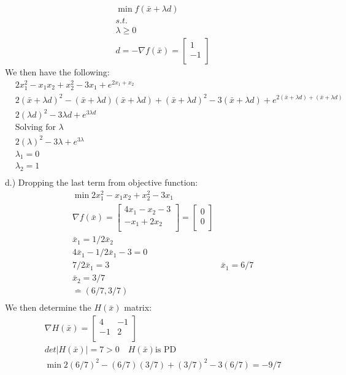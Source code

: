 \documentclass[12pt]{article}
\begin{document}
    \begin{align*}
        &\min f(\bar x + \lambda d)\\
        &s.t. \\
        &\lambda \geq 0\\
        &d = -\nabla f(\bar x) = 
        \begin{bmatrix}
            1\\
            -1\\
        \end{bmatrix}
    \end{align*}
We then have the following: 
    \begin{align*}
        &2x_1^2 -x_1x_2 + x_2^2 - 3x_1 + e^{2x_1 + x_2}\\
        &2(\bar x + \lambda d)^2 -(\bar x + \lambda d)(\bar x + \lambda d) + (\bar x + \lambda d)^2 - 3(\bar x + \lambda d)+ e^{2(\bar x + \lambda d) + (\bar x + \lambda d)}\\
        &2(\lambda d)^2 - 3\lambda  d + e^{3 \lambda d}\\
        &\text{Solving for } \lambda \\ 
        &2(\lambda)^2 - 3\lambda+ e^{3 \lambda}\\
        &\lambda_1 = 0\\
        &\lambda_2 = 1\\
    \end{align*}
d.) Dropping the last term from objective function:\\
    \begin{align*}
        &\min 2x_1^2 -x_1x_2 + x_2^2 - 3x_1\\
        &\nabla f(\bar x) = 
        \begin{bmatrix}
            4x_1 - x_2 -3\\
            -x_1 + 2x_2\\
        \end{bmatrix}
        = 
        \begin{bmatrix}
            0\\
            0\\
        \end{bmatrix}\\
        &\bar x_1 = 1/2 \bar x_2\\
        &4 \bar x_1 - 1/2 \bar x_1 - 3 = 0 \\ 
        &7/2\bar x_1 = 3
        &\bar x_1 = 6/7\\
        &\bar x_2 = 3/7\\
        &\bar = (6/7 , 3/7)\\ 
    \end{align*}
We then determine the $H(\bar x)$ matrix: 
    \begin{align*}
        &\nabla H(\bar x) = 
        \begin{bmatrix}
            4 & -1\\
            -1 & 2\\
        \end{bmatrix}\\
        &det|H(\bar x)| = 7 > 0 \quad H(\bar x) \text{is PD}\\
        &\min 2(6/7)^2 - (6/7)(3/7) + (3/7)^2 - 3 (6/7) = -9/7 
    \end{align*}
\end{document}
